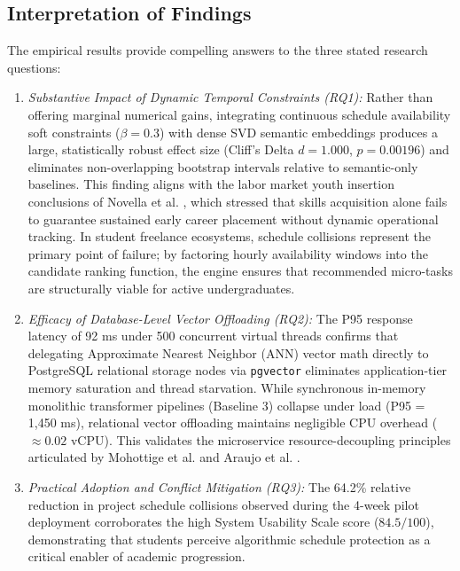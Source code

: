 \documentclass[a4paper,fleqn]{cas-dc}
\begin{document}
\subsection{Interpretation of Findings}
The empirical results provide compelling answers to the three stated research questions:
\begin{enumerate}
    \item \textit{Substantive Impact of Dynamic Temporal Constraints (RQ1):} Rather than offering marginal numerical gains, integrating continuous schedule availability soft constraints ($\beta = 0.3$) with dense SVD semantic embeddings produces a large, statistically robust effect size (Cliff's Delta $d = 1.000$, $p = 0.00196$) and eliminates non-overlapping bootstrap intervals relative to semantic-only baselines. This finding aligns with the labor market youth insertion conclusions of Novella et al. \cite{novella2024}, which stressed that skills acquisition alone fails to guarantee sustained early career placement without dynamic operational tracking. In student freelance ecosystems, schedule collisions represent the primary point of failure; by factoring hourly availability windows into the candidate ranking function, the engine ensures that recommended micro-tasks are structurally viable for active undergraduates.
    \item \textit{Efficacy of Database-Level Vector Offloading (RQ2):} The P95 response latency of 92 ms under 500 concurrent virtual threads confirms that delegating Approximate Nearest Neighbor (ANN) vector math directly to PostgreSQL relational storage nodes via \texttt{pgvector} eliminates application-tier memory saturation and thread starvation. While synchronous in-memory monolithic transformer pipelines (Baseline 3) collapse under load (P95 = 1,450 ms), relational vector offloading maintains negligible CPU overhead ($\approx 0.02$ vCPU). This validates the microservice resource-decoupling principles articulated by Mohottige et al. \cite{mohottige2025} and Araujo et al. \cite{araujo2024}.
    \item \textit{Practical Adoption and Conflict Mitigation (RQ3):} The 64.2\% relative reduction in project schedule collisions observed during the 4-week pilot deployment corroborates the high System Usability Scale score ($84.5 / 100$), demonstrating that students perceive algorithmic schedule protection as a critical enabler of academic progression.
\end{enumerate}
\end{document}
